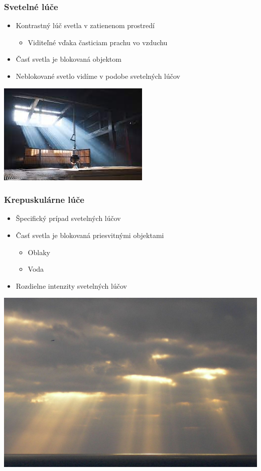 \documentclass{beamer}
\begin{document}
\begin{frame}[fragile=singleslide]\frametitle{Svetelné lúče}
\begin{itemize}
\item Kontrastný lúč svetla v zatienenom prostredí
	\begin{itemize}
	\item Viditeľné vďaka časticiam prachu vo vzduchu
	\end{itemize}
\item Časť svetla je blokovaná objektom 
\item Neblokované svetlo vidíme v podobe svetelných lúčov
\end{itemize}
\begin{center}
\includegraphics[scale=.5]{Svetelne_luce.jpg}
\end{center}
\end{frame}

\begin{frame}[fragile=singleslide]\frametitle{Krepuskulárne lúče}
\begin{itemize}
\item Špecifický prípad svetelných lúčov
\item Časť svetla je blokovaná priesvitnými objektami
	\begin{itemize}
	\item Oblaky
	\item Voda
	\end{itemize}
\item Rozdielne intenzity svetelných lúčov
\end{itemize}
\begin{center}
\includegraphics[scale=.15]{god_ray.jpg}
\end{center}
\end{frame}
\end{document}
